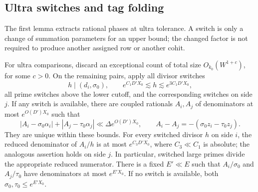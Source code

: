 \subsection{Ultra switches and tag folding}

The first lemma extracts rational phases at ultra tolerance. A switch is
only a change of summation parameters for an upper bound; the changed
factor is not required to produce another assigned row or another cohit.

\begin{lemma}\label{dir:ultra-switch}
For ultra comparisons, discard an exceptional count of total size
$O_{k_0}(W^{1+c})$, for some $c>0$. On the remaining pairs, apply all
divisor switches
\[
 h\mid(d_i,\sigma_0),\qquad
 e^{C_1D'X_0}\lesssim h\lesssim e^{3C_1D'X_0},
\]
all prime switches above the lower cutoff, and the corresponding switches
on side $j$. If any switch is available, there are coupled rationals
$A_i,A_j$ of denominators at most $e^{O(D')X_0}$ such that
\[
 |A_i-\sigma_0\alpha_i|+|A_j-\tau_0\alpha_j|
       \ll\Delta e^{O(D')X_0},
 \qquad A_i-A_j=-(\sigma_0z_i-\tau_0z_j).
\]
They are unique within these bounds. For every switched divisor $h$ on
side $i$, the reduced denominator of $A_i/h$ is at most
$e^{C_3D'X_0}$, where $C_3\ll C_1$ is absolute; the analogous assertion
holds on side $j$. In particular, switched large primes divide the
appropriate reduced numerator. There is a fixed $E'\ll E$ such that
$A_i/\sigma_0$ and $A_j/\tau_0$ have denominators at most $e^{E'X_0}$.
If no switch is available, both $\sigma_0,\tau_0\le e^{E'X_0}$.
\end{lemma}

